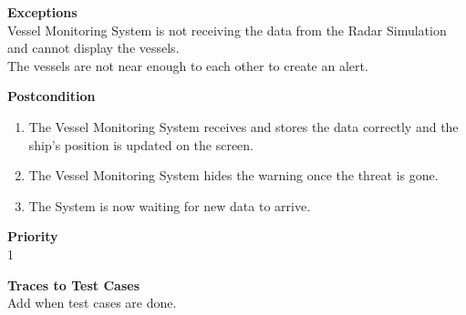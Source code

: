 \noindent
{\bf Exceptions}\\
Vessel Monitoring System is not receiving the data from the Radar Simulation and cannot display the vessels.\\
The vessels are not near enough to each other to create an alert.

\noindent
{\bf Postcondition}\\
\vspace*{-0.2in}
\begin{enumerate}
\item The Vessel Monitoring System receives and stores the data correctly and the ship's position is updated on the screen.
\item The Vessel Monitoring System hides the warning once the threat is gone.
\item The System is now waiting for new data to arrive.
\end{enumerate}

\noindent
{\bf Priority}\\
1

\noindent
{\bf Traces to Test Cases}\\
Add when test cases are done.
